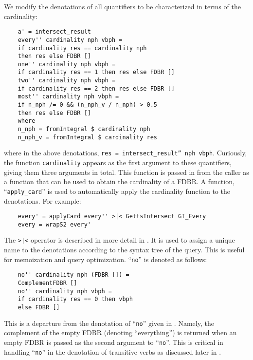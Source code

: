 \documentclass[../main.tex]{subfiles}
\begin{document}
\begin{refsection}
We modify the denotations of all quantifiers to be characterized in terms of the cardinality:
\begin{small}
	\begin{verbatim}
    a' = intersect_result
    every'' cardinality nph vbph =
    if cardinality res == cardinality nph
    then res else FDBR []
    one'' cardinality nph vbph =
    if cardinality res == 1 then res else FDBR []
    two'' cardinality nph vbph =
    if cardinality res == 2 then res else FDBR []
    most'' cardinality nph vbph =
    if n_nph /= 0 && (n_nph_v / n_nph) > 0.5
    then res else FDBR []
    where
    n_nph = fromIntegral $ cardinality nph
    n_nph_v = fromIntegral $ cardinality res
	\end{verbatim}
\end{small}
where in the above denotations, \texttt{res = intersect\_result'' nph vbph}.
Curiously, the function \texttt{cardinality} appears as the first argument to these
quantifiers, giving them three arguments in total.  This function is passed in from the caller
as a function that can be used to obtain the cardinality of a FDBR.  A function, ``\texttt{apply\_card}'' is used to automatically apply the cardinality function to the denotations.  For example:
\begin{small}
	\begin{verbatim}
    every' = applyCard every'' >|< GettsIntersect GI_Every
    every = wrapS2 every'
	\end{verbatim}
\end{small}
The \texttt{>|<} operator is described in more detail in \cite{peelar2020webistjournal}.  It
is used to assign a unique name to the denotations according to the syntax tree of the query.
This is useful for memoization and query optimization.
``\texttt{no}'' is denoted as follows:
\begin{small}
	\begin{verbatim}
    no'' cardinality nph (FDBR []) =
    ComplementFDBR []
    no'' cardinality nph vbph =
    if cardinality res == 0 then vbph
    else FDBR []
	\end{verbatim}
\end{small}
This is a departure from the denotation of ``\texttt{no}'' given in \cite{frostboulos2002}.
Namely, the complement of the empty FDBR (denoting ``everything'') is returned when an empty
FDBR is passed as the second argument to ``\texttt{no}''.  This is critical in handling ``\texttt{no}'' in the denotation of transitive verbs as discussed later in .


\end{refsection}
\end{document}
